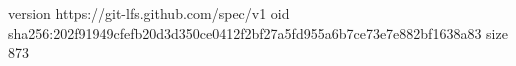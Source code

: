 version https://git-lfs.github.com/spec/v1
oid sha256:202f91949cfefb20d3d350ce0412f2bf27a5fd955a6b7ce73e7e882bf1638a83
size 873
